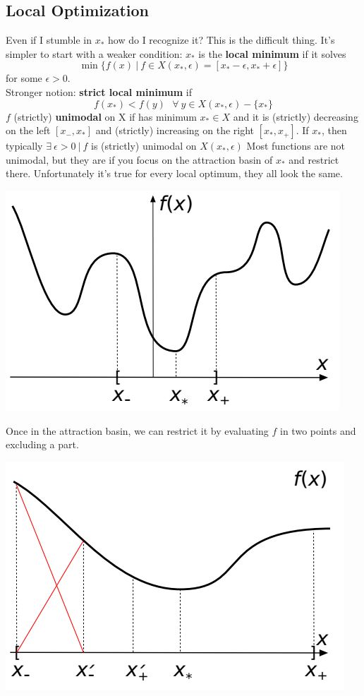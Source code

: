 \documentclass[10pt]{report}
\begin{document}
\subsection{Local Optimization} Even if I stumble in $x_*$ how do I recognize it? This is the difficult thing. It's simpler to start with a weaker condition: $x_*$ is the \textbf{local minimum} if it solves $$\min\{f(x)\:|\:f\in X(x_*, \epsilon) = [x_* - \epsilon, x_* + \epsilon]\}$$ for some $\epsilon > 0$.\\
Stronger notion: \textbf{strict local minimum} if $$f(x_*) < f(y)\:\:\:\forall\:y\in X(x_*,\epsilon) - \{x_*\}$$
$f$ (strictly) \textbf{unimodal} on X if has minimum $x_* \in X$ and it is (strictly) decreasing on the left $[x_-, x_*]$ and (strictly) increasing on the right $[x_*, x_+]$. If $x_*$, then typically $\exists\:\epsilon>0\:|\:f$ is (strictly) unimodal on $X(x_*,\epsilon)$
Most functions are not unimodal, but they are if you focus on the attraction basin of $x_*$ and restrict there. Unfortunately it's true for every local optimum, they all look the same.
\begin{center}
	\includegraphics[scale=0.5]{5.png}
\end{center}
Once in the attraction basin, we can restrict it by evaluating $f$ in two points and excluding a part.
\begin{center}
	\includegraphics[scale=0.5]{6.png}
\end{center}
\end{document}
